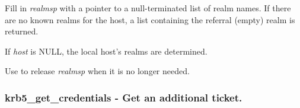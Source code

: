 \documentclass[letterpaper,10pt,english]{sphinxmanual}
\begin{document}
Fill in \emph{realmsp} with a pointer to a null-terminated list of realm names. If there are no known realms for the host, a list containing the referral (empty) realm is returned.

If \emph{host} is NULL, the local host's realms are determined.

Use {\hyperref[appdev/refs/api/krb5_free_host_realm:c.krb5_free_host_realm]{}} to release \emph{realmsp} when it is no longer needed.


\subsubsection{krb5\_get\_credentials -  Get an additional ticket.}
\label{appdev/refs/api/krb5_get_credentials:krb5-get-credentials-get-an-additional-ticket}\label{appdev/refs/api/krb5_get_credentials::doc}

\begin{fulllineitems}
\label{appdev/refs/api/krb5_get_credentials:c.krb5_get_credentials}
\end{fulllineitems}
\end{document}
